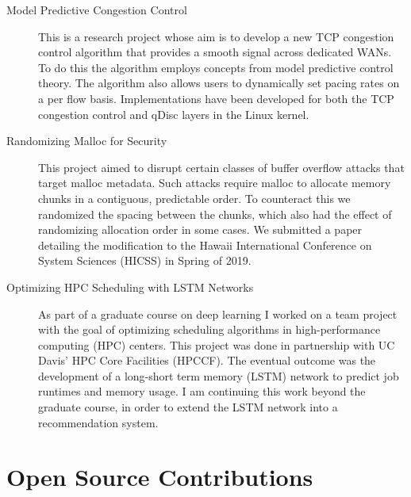 \documentclass{resume}
\begin{document}
\begin{description}
    \item[Model Predictive Congestion Control]
        This is a research project whose aim is to develop a new TCP congestion
        control algorithm that provides a smooth signal across dedicated WANs.
        To do this the algorithm employs concepts from model predictive control
        theory.
        The algorithm also allows users to dynamically set pacing rates on a per
        flow basis.
        Implementations have been developed for both the TCP congestion control
        and qDisc layers in the Linux kernel.

    \item[Randomizing Malloc for Security]
        This project aimed to disrupt certain classes of buffer overflow attacks
        that target malloc metadata.
        Such attacks require malloc to allocate memory chunks in a contiguous,
        predictable order.
        To counteract this we randomized the spacing between the chunks, which
        also had the effect of randomizing allocation order in some cases.
        We submitted a paper detailing the modification to the Hawaii
        International Conference on System Sciences (HICSS) in Spring of 2019.

      \item[Optimizing HPC Scheduling with LSTM Networks]
        As part of a graduate course on deep learning I worked on a
        team project with the goal of optimizing scheduling algorithms in
        high-performance computing (HPC) centers.
        This project was done in partnership with UC Davis' HPC Core
        Facilities (HPCCF).
        The eventual outcome was the development of a long-short term
        memory (LSTM) network to predict job runtimes and memory usage.
        I am continuing this work beyond the graduate course, in order to
        extend the LSTM network into a recommendation system.
\end{description}


\section*{Open Source Contributions}

\begin{description}



\end{description}
\end{document}
